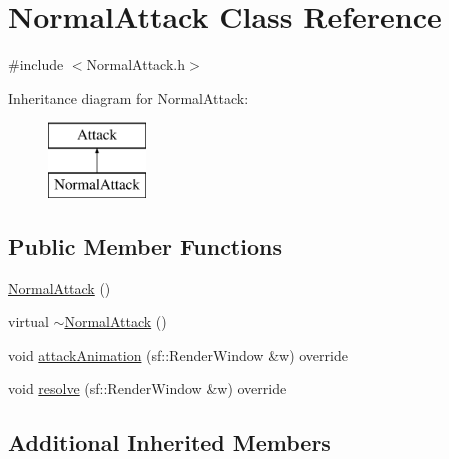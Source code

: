 \hypertarget{class_normal_attack}{\section{Normal\+Attack Class Reference}
\label{class_normal_attack}
}


{\ttfamily \#include $<$Normal\+Attack.\+h$>$}

Inheritance diagram for Normal\+Attack\+:\begin{figure}[H]
\begin{center}
\leavevmode
\includegraphics[height=2.000000cm]{class_normal_attack}
\end{center}
\end{figure}
\subsection*{Public Member Functions}
\begin{DoxyCompactItemize}
\item 
\hyperlink{class_normal_attack_a0570b31144ad70038827fb191c768b94}{Normal\+Attack} ()
\item 
virtual \hyperlink{class_normal_attack_a7dcfafca4da1344ed3aad0f0120d20ed}{$\sim$\+Normal\+Attack} ()
\item 
void \hyperlink{class_normal_attack_ae56877c3a110e0b4541776b89e252b10}{attack\+Animation} (sf\+::\+Render\+Window \&w) override
\item 
void \hyperlink{class_normal_attack_a949ea101fc201897cd3cd262b2870388}{resolve} (sf\+::\+Render\+Window \&w) override
\end{DoxyCompactItemize}
\subsection*{Additional Inherited Members}


